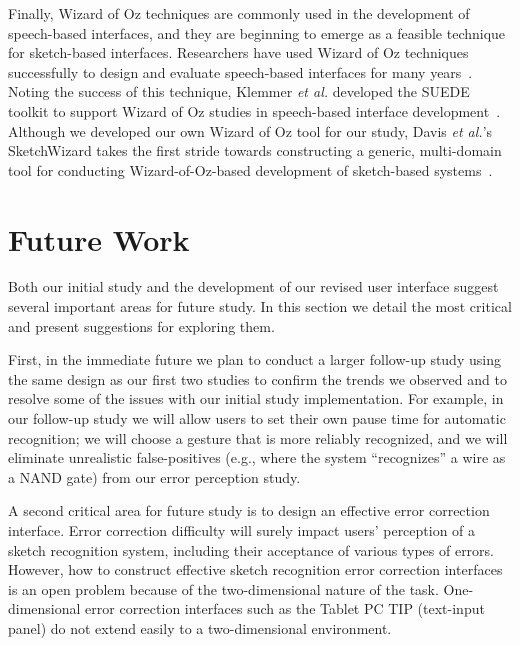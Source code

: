 \documentclass{elsart}
\begin{document}
Finally, Wizard of Oz techniques are commonly used in the development
of speech-based interfaces, and they are beginning to emerge as a
feasible technique for sketch-based interfaces.  Researchers have used
Wizard of Oz techniques successfully to design and evaluate
speech-based interfaces for many
years~\cite{Dahlback1993Wizard,Gould1983Composing}. Noting the success
of this technique, Klemmer
\textit{et al.} developed the SUEDE toolkit to support Wizard of Oz
studies in speech-based interface development~\cite{Klemmer2000Suede}.
Although we developed our own Wizard of Oz tool for our study, Davis
\textit{et al.}'s SketchWizard takes the first stride towards
constructing a generic, multi-domain tool for conducting
Wizard-of-Oz-based development of sketch-based
systems~\cite{Davis2007SketchWizard}.

\section{Future Work}

Both our initial study and the development of our revised user interface
suggest several important areas for future study.  In this section we
detail the most critical and present suggestions for exploring them.

First, in the immediate future we plan to conduct a larger follow-up
study using the same design as our first two studies to confirm the
trends we observed and to resolve some of the issues with our initial
study implementation.  For example, in our follow-up study we will
allow users to set their own pause time for automatic recognition; we
will choose a gesture that is more reliably recognized, and we will
eliminate unrealistic false-positives (e.g., where the
system ``recognizes'' a wire as a NAND gate) from our error perception
study.

A second critical area for future study is to design an effective
error correction interface.  Error correction difficulty will
surely impact users' perception of a sketch recognition system,
including their acceptance of various types of errors.  However, how
to construct effective sketch recognition error correction interfaces
is an open problem because of the two-dimensional nature of the task.
One-dimensional error correction interfaces such as the Tablet PC TIP
(text-input panel) do not extend easily to a two-dimensional
environment.

\end{document}
